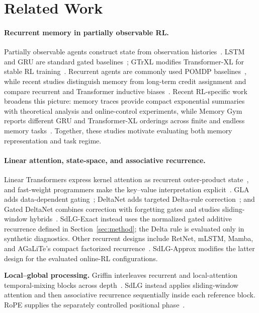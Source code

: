 \section{Related Work}
\label{sec:related}

\paragraph{Recurrent memory in partially observable RL.}
Partially observable agents construct state from observation histories~\cite{kaelbling1998planning,sutton2018reinforcement}. LSTM and GRU are standard gated baselines~\cite{hochreiter1997long,cho2014learning}; GTrXL modifies Transformer-XL for stable RL training~\cite{parisotto2020stabilizing}. Recurrent agents are commonly used POMDP baselines~\cite{ni2022recurrent}, while recent studies distinguish memory from long-term credit assignment and compare recurrent and Transformer inductive biases~\cite{ni2023when,lu2024rethinking}.
Recent RL-specific work broadens this picture: memory traces provide compact exponential summaries with theoretical analysis and online-control experiments, while Memory Gym reports different GRU and Transformer-XL orderings across finite and endless memory tasks~\cite{eberhard2025memory,pleines2025memorygym}. Together, these studies motivate evaluating both memory representation and task regime.

\paragraph{Linear attention, state-space, and associative recurrence.}
Linear Transformers express kernel attention as recurrent outer-product state~\cite{katharopoulos2020transformers}, and fast-weight programmers make the key--value interpretation explicit~\cite{schlag2021linear}. GLA adds data-dependent gating~\cite{yang2024gated}; DeltaNet adds targeted Delta-rule correction~\cite{yang2024delta}; and Gated DeltaNet combines correction with forgetting gates and studies sliding-window hybrids~\cite{yang2025gateddelta}. SdLG-Exact instead uses the normalized gated additive recurrence defined in Section~\ref{sec:method}; the Delta rule is evaluated only in synthetic diagnostics. Other recurrent designs include RetNet, mLSTM, Mamba, and AGaLiTe's compact factorized recurrence~\cite{sun2023retentive,beck2024xlstm,gu2023mamba,pramanik2024agalite}. SdLG-Approx modifies the latter design for the evaluated online-RL configurations.

\par\vspace{0.45\baselineskip}\noindent\textbf{Local--global processing.}
Griffin interleaves recurrent and local-attention temporal-mixing blocks across depth~\cite{de2024griffin}. SdLG instead applies sliding-window attention and then associative recurrence sequentially inside each reference block. RoPE supplies the separately controlled positional phase~\cite{su2024roformer}.

